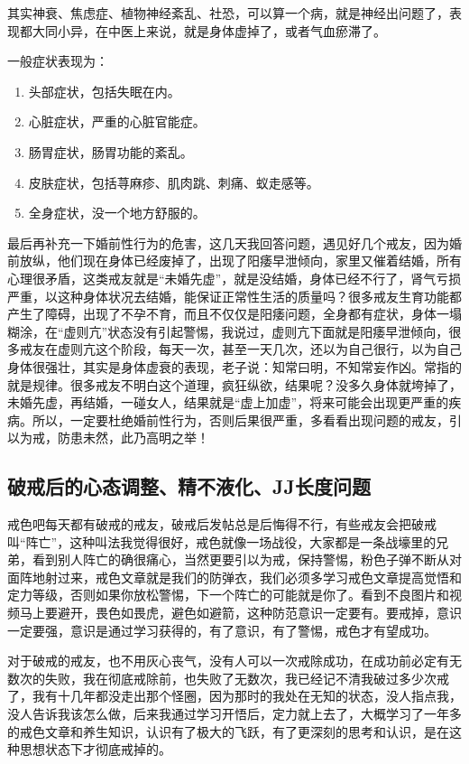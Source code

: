 \documentclass[fontset=founder]{ctexart}
\begin{document}
其实神衰、焦虑症、植物神经紊乱、社恐，可以算一个病，就是神经出问题了，表现都大同小异，在中医上来说，就是身体虚掉了，或者气血瘀滞了。


一般症状表现为：
\begin{enumerate}
    \item 头部症状，包括失眠在内。
    \item 心脏症状，严重的心脏官能症。
    \item 肠胃症状，肠胃功能的紊乱。
    \item 皮肤症状，包括荨麻疹、肌肉跳、刺痛、蚁走感等。
    \item 全身症状，没一个地方舒服的。
\end{enumerate}

最后再补充一下婚前性行为的危害，这几天我回答问题，遇见好几个戒友，因为婚前放纵，他们现在身体已经废掉了，出现了阳痿早泄倾向，家里又催着结婚，所有心理很矛盾，这类戒友就是“未婚先虚”，就是没结婚，身体已经不行了，肾气亏损严重，以这种身体状况去结婚，能保证正常性生活的质量吗？很多戒友生育功能都产生了障碍，出现了不孕不育，而且不仅仅是阳痿问题，全身都有症状，身体一塌糊涂，在“虚则亢”状态没有引起警惕，我说过，虚则亢下面就是阳痿早泄倾向，很多戒友在虚则亢这个阶段，每天一次，甚至一天几次，还以为自己很行，以为自己身体很强壮，其实是身体虚衰的表现，老子说：知常曰明，不知常妄作凶。常指的就是规律。很多戒友不明白这个道理，疯狂纵欲，结果呢？没多久身体就垮掉了，未婚先虚，再结婚，一碰女人，结果就是“虚上加虚”，将来可能会出现更严重的疾病。所以，一定要杜绝婚前性行为，否则后果很严重，多看看出现问题的戒友，引以为戒，防患未然，此乃高明之举！

\subsection{破戒后的心态调整、精不液化、JJ长度问题}

戒色吧每天都有破戒的戒友，破戒后发帖总是后悔得不行，有些戒友会把破戒叫“阵亡”，这种叫法我觉得很好，戒色就像一场战役，大家都是一条战壕里的兄弟，看到别人阵亡的确很痛心，当然更要引以为戒，保持警惕，粉色子弹不断从对面阵地射过来，戒色文章就是我们的防弹衣，我们必须多学习戒色文章提高觉悟和定力等级，否则如果你放松警惕，下一个阵亡的可能就是你了。看到不良图片和视频马上要避开，畏色如畏虎，避色如避箭，这种防范意识一定要有。要戒掉，意识一定要强，意识是通过学习获得的，有了意识，有了警惕，戒色才有望成功。

对于破戒的戒友，也不用灰心丧气，没有人可以一次戒除成功，在成功前必定有无数次的失败，我在彻底戒除前，也失败了无数次，我已经记不清我破过多少次戒了，我有十几年都没走出那个怪圈，因为那时的我处在无知的状态，没人指点我，没人告诉我该怎么做，后来我通过学习开悟后，定力就上去了，大概学习了一年多的戒色文章和养生知识，认识有了极大的飞跃，有了更深刻的思考和认识，是在这种思想状态下才彻底戒掉的。
\end{document}
